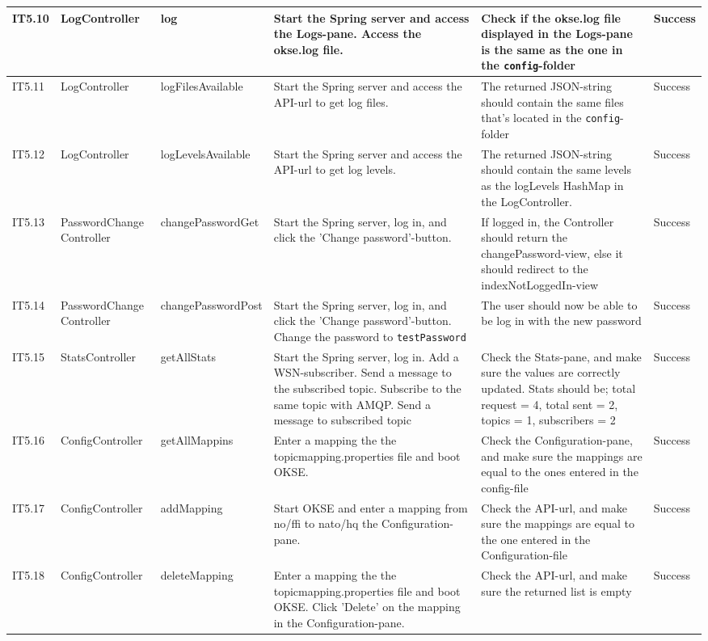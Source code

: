 \begin{table}[ht!]
\begin{tabular}{|m{0.5cm}|m{1.5cm}|m{1.5cm}|m{3cm}|m{3cm}|m{1.5cm}|}
IT5.10 & LogController & log & Start the Spring server and access the Logs-pane. Access the okse.log file. & Check if the okse.log file displayed in the Logs-pane is the same as the one in the \verb!config!-folder & Success \\ \hline
IT5.11 & LogController & logFilesAvailable & Start the Spring server and access the API-url to get log files. & The returned JSON-string should contain the same files that's located in the \verb!config!-folder & Success \\ \hline
IT5.12 & LogController & logLevelsAvailable & Start the Spring server and access the API-url to get log levels. & The returned JSON-string should contain the same levels as the logLevels HashMap in the LogController. & Success \\ \hline
IT5.13 & PasswordChange Controller & changePasswordGet & Start the Spring server, log in, and click the 'Change password'-button. & If logged in, the Controller should return the changePassword-view, else it should redirect to the indexNotLoggedIn-view & Success \\ \hline
IT5.14 & PasswordChange Controller & changePasswordPost & Start the Spring server, log in, and click the 'Change password'-button. Change the password to \verb!testPassword! & The user should now be able to be log in with the new password & Success \\ \hline
IT5.15 & StatsController & getAllStats & Start the Spring server, log in. Add a WSN-subscriber. Send a message to the subscribed topic. Subscribe to the same topic with AMQP. Send a message to subscribed topic & Check the Stats-pane, and make sure the values are correctly updated. Stats should be; total request = 4, total sent = 2, topics = 1, subscribers = 2 & Success \\ \hline
IT5.16 & ConfigController & getAllMappins & Enter a mapping the the topicmapping.properties file and boot OKSE.  & Check the Configuration-pane, and make sure the mappings are equal to the ones entered in the config-file & Success \\ \hline
IT5.17 & ConfigController & addMapping & Start OKSE and enter a mapping from no/ffi to nato/hq the Configuration-pane. & Check the API-url, and make sure the mappings are equal to the one entered in the Configuration-file & Success \\ \hline
IT5.18 & ConfigController & deleteMapping & Enter a mapping the the topicmapping.properties file and boot OKSE. Click 'Delete' on the mapping in the Configuration-pane. & Check the API-url, and make sure the returned list is empty & Success \\ \hline

\end{tabular}
\end{table}
